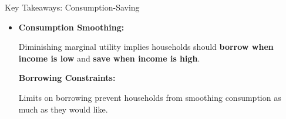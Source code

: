 \documentclass[10pt,aspectratio=169]{beamer}
\begin{document}
\begin{frame}{Key Takeaways: Consumption-Saving}
\begin{itemize}
    \item \textbf{Consumption Smoothing:} 
    \begin{itemize}
        \itemvso Diminishing marginal utility implies households should \textbf{borrow when income is low} and \textbf{save when income is high}.
    \end{itemize}

    \itemvso \textbf{Borrowing Constraints:} 
    \begin{itemize}
        \itemvso Limits on borrowing prevent households from smoothing consumption as much as they would like.
    \end{itemize}
\end{itemize}
\end{frame}
\end{document}
